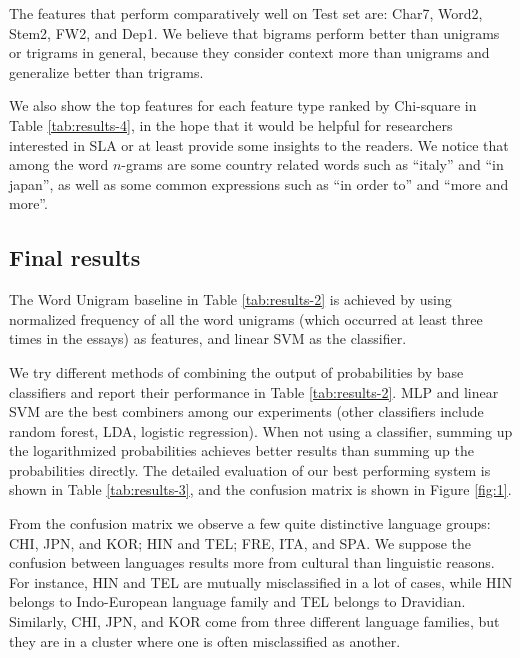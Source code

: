 \documentclass[11pt,letterpaper]{article}
\begin{document}
The features that perform comparatively well on Test set are: Char7, Word2, Stem2, FW2, and Dep1. We believe that bigrams perform better than unigrams or trigrams in general, because they consider context more than unigrams and generalize better than trigrams.

We also show the top features for each feature type ranked by Chi-square in Table \ref{tab:results-4}, in the hope that it would be helpful for  researchers interested in SLA or at least provide some insights to the readers. We notice that among the word $n$-grams are some country related words such as ``italy'' and ``in japan'', as well as some common expressions such as ``in order to'' and ``more and more''.

\subsection{Final results}
The Word Unigram baseline in Table \ref{tab:results-2} is achieved by using normalized frequency of all the word unigrams (which occurred at least three times in the essays) as features, and linear SVM as the classifier. 

We try different methods of combining the output of probabilities by base classifiers and report their performance in Table \ref{tab:results-2}. MLP and linear SVM are the best combiners among our experiments (other classifiers include random forest, LDA, logistic regression). When not using a classifier, summing up the logarithmized probabilities achieves better results than summing up the probabilities directly. The detailed evaluation of our best performing system is shown in Table \ref{tab:results-3}, and the confusion matrix is shown in Figure \ref{fig:1}.

From the confusion matrix we observe a few quite distinctive language groups: CHI, JPN, and KOR; HIN and TEL; FRE, ITA, and SPA. We suppose the confusion between languages results more from cultural than linguistic reasons. For instance, HIN and TEL are mutually misclassified in a lot of cases, while HIN belongs to Indo-European language family and TEL belongs to Dravidian. Similarly, CHI, JPN, and KOR come from three different language families, but they are in a cluster where one is often misclassified as another. 
\end{document}
